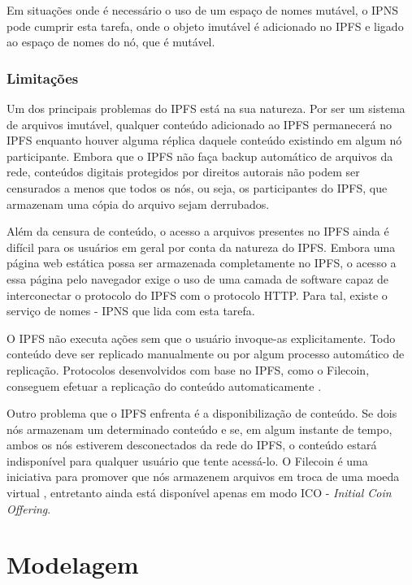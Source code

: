\documentclass[tcc,capa]{texufpel}
\begin{document}
        Em situações onde é necessário o uso de um espaço de nomes mutável, o IPNS pode cumprir esta tarefa, onde o objeto imutável é adicionado no IPFS e ligado ao espaço de nomes do nó, que é mutável. 
        
    
    \subsection{Limitações}
    
    Um dos principais problemas do IPFS está na sua natureza. Por ser um sistema de arquivos imutável, qualquer conteúdo adicionado ao IPFS permanecerá no IPFS enquanto houver alguma réplica daquele conteúdo existindo em algum nó participante. Embora que o IPFS não faça backup automático de arquivos da rede, conteúdos digitais protegidos por direitos autorais não podem ser censurados a menos que todos os nós, ou seja, os participantes do IPFS, que armazenam uma cópia do arquivo sejam derrubados.
    
    Além da censura de conteúdo, o acesso a arquivos presentes no IPFS ainda é difícil para os usuários em geral por conta da natureza do IPFS. Embora uma página web estática possa ser armazenada completamente no IPFS, o acesso a essa página pelo navegador exige o uso de uma camada de software capaz de interconectar o protocolo do IPFS com o protocolo HTTP. Para tal, existe o serviço de nomes - IPNS que lida com esta tarefa.
    
    O IPFS não executa ações sem que o usuário invoque-as explicitamente. Todo conteúdo deve ser replicado manualmente ou por algum processo automático de replicação. Protocolos desenvolvidos com base no IPFS, como o Filecoin, conseguem efetuar a replicação do conteúdo automaticamente \cite{jbenet47issue}.
    
    Outro problema que o IPFS enfrenta é a disponibilização de conteúdo. Se dois nós armazenam um determinado conteúdo e se, em algum instante de tempo, ambos os nós estiverem desconectados da rede do IPFS, o conteúdo estará indisponível para qualquer usuário que tente acessá-lo. O Filecoin é uma iniciativa para promover que nós armazenem arquivos em troca de uma moeda virtual \cite{protocollabs}, entretanto ainda está disponível apenas em modo ICO - \textit{Initial Coin Offering}.
        

\chapter{Modelagem}\label{chap:modelagem}
\end{document}
